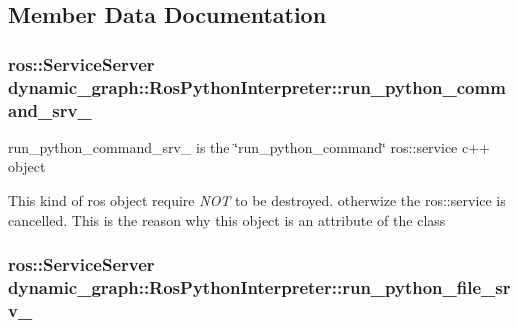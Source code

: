 \subsection{Member Data Documentation}
\subsubsection[{\texorpdfstring{run\+\_\+python\+\_\+command\+\_\+srv\+\_\+}{run_python_command_srv_}}]{\setlength{\rightskip}{0pt plus 5cm}ros\+::\+Service\+Server dynamic\+\_\+graph\+::\+Ros\+Python\+Interpreter\+::run\+\_\+python\+\_\+command\+\_\+srv\+\_\+\hspace{0.3cm}{\ttfamily [private]}}\hypertarget{classdynamic__graph_1_1RosPythonInterpreter_a10b59f74957922f74e84709b2a6920da}{}\label{classdynamic__graph_1_1RosPythonInterpreter_a10b59f74957922f74e84709b2a6920da}


run\+\_\+python\+\_\+command\+\_\+srv\+\_\+ is the \char`\"{}run\+\_\+python\+\_\+command\char`\"{} ros\+::service c++ object 

This kind of ros object require {\itshape N\+OT} to be destroyed. otherwize the ros\+::service is cancelled. This is the reason why this object is an attribute of the class 
\subsubsection[{\texorpdfstring{run\+\_\+python\+\_\+file\+\_\+srv\+\_\+}{run_python_file_srv_}}]{\setlength{\rightskip}{0pt plus 5cm}ros\+::\+Service\+Server dynamic\+\_\+graph\+::\+Ros\+Python\+Interpreter\+::run\+\_\+python\+\_\+file\+\_\+srv\+\_\+\hspace{0.3cm}{\ttfamily [private]}}\hypertarget{classdynamic__graph_1_1RosPythonInterpreter_aebb8e4197d11cef0bd49b613b761e081}{}\label{classdynamic__graph_1_1RosPythonInterpreter_aebb8e4197d11cef0bd49b613b761e081}


